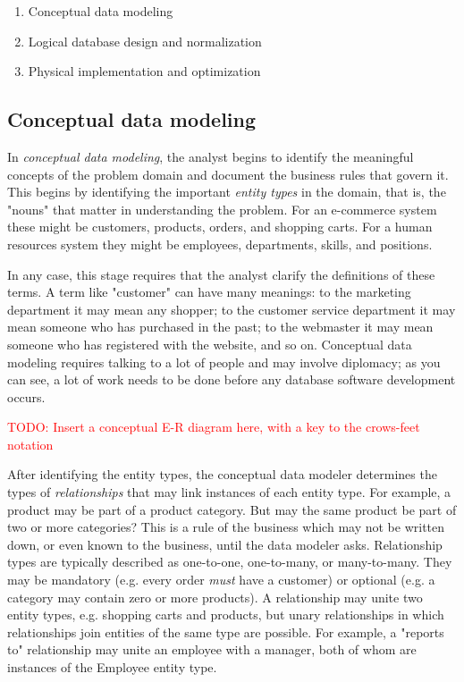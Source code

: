 \documentclass[11pt]{book}
\newcommand{\term}[1]{\emph{#1}} %
\newcommand{\todo}[1]{\textcolor{red}{TODO: #1}} %
\begin{document}
\begin{enumerate}
    \item Conceptual data modeling
    \item Logical database design and normalization
    \item Physical implementation and optimization
\end{enumerate}

\subsection{Conceptual data modeling}

In \term{conceptual data modeling}, the analyst begins to identify the meaningful concepts of the problem domain and document the business rules that govern it.  This begins by identifying the important \term{entity types} in the domain, that is, the "nouns" that matter in understanding the problem.  For an e-commerce system these might be customers, products, orders, and shopping carts.  For a human resources system they might be employees, departments, skills, and positions.  

In any case, this stage requires that the analyst clarify the definitions of these terms.  A term like "customer" can have many meanings: to the marketing department it may mean any shopper; to the customer service department it may mean someone who has purchased in the past; to the webmaster it may mean someone who has registered with the website, and so on.  Conceptual data modeling requires talking to a lot of people and may involve diplomacy; as you can see, a lot of work needs to be done before any database software development occurs.

\todo{Insert a conceptual E-R diagram here, with a key to the crows-feet notation}

After identifying the entity types, the conceptual data modeler determines the types of \term{relationships} that may link instances of each entity type.  For example, a product may be part of a product category.  But may the same product be part of two or more categories?  This is a rule of the business which may not be written down, or even known to the business, until the data modeler asks.  Relationship types are typically described as one-to-one, one-to-many, or many-to-many.  They may be mandatory (e.g. every order \emph{must} have a customer) or optional (e.g. a category may contain zero or more products).  A relationship may unite two entity types, e.g. shopping carts and products, but unary relationships in which relationships join entities of the same type are possible.  For example, a "reports to" relationship may unite an employee with a manager, both of whom are instances of the Employee entity type.
\end{document}
